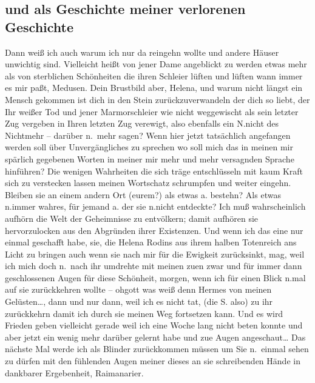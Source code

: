 \documentclass[
]{article}
\author{}
\date{\vspace{-2.5em}}
\begin{document}
\subsection{und als Geschichte meiner verlorenen
Geschichte}\label{und-als-geschichte-meiner-verlorenen-geschichte}

Dann weiß ich auch warum ich nur da reingehn wollte und andere Häuser
unwichtig sind. Vielleicht heißt von jener Dame angeblickt zu werden
etwas mehr als von sterblichen Schönheiten die ihren Schleier lüften und
lüften wann immer es mir paßt, Medusen. Dein Brustbild aber, Helena, und
warum nicht längst ein Mensch gekommen ist dich in den Stein
zurückzuverwandeln der dich so liebt, der Ihr weißer Tod und jener
Marmorschleier wie nicht weggewischt als sein letzter Zug vergeben in
Ihren letzten Zug verewigt, also ebenfalls ein N.nicht des Nichtmehr --
darüber n.~mehr sagen? Wenn hier jetzt tatsächlich angefangen werden
soll über Unvergängliches zu sprechen wo soll mich das in meinen mir
spärlich gegebenen Worten in meiner mir mehr und mehr versagnden Sprache
hinführen? Die wenigen Wahrheiten die sich träge entschlüsseln mit kaum
Kraft sich zu verstecken lassen meinen Wortschatz schrumpfen und weiter
eingehn. Bleiben sie an einem andern Ort (eurem?) als etwas a. bestehn?
Als etwas n.immer wahres, für jemand a. der sie n.nicht entdeckte? Ich
muß wahrscheinlich aufhörn die Welt der Geheimnisse zu entvölkern; damit
aufhören sie hervorzulocken aus den Abgründen ihrer Existenzen. Und wenn
ich das eine nur einmal geschafft habe, sie, die Helena Rodins aus ihrem
halben Totenreich ans Licht zu bringen auch wenn sie nach mir für die
Ewigkeit zurücksinkt, mag, weil ich mich doch n.~nach ihr umdrehte mit
meinen zuen zwar und für immer dann geschlossenen Augen für diese
Schönheit, morgen, wenn ich für einen Blick n.mal auf sie zurückkehren
wollte -- ohgott was weiß denn Hermes von meinen Gelüsten\ldots, dann
und nur dann, weil ich es nicht tat, (die S. also) zu ihr zurückkehrn
damit ich durch sie meinen Weg fortsetzen kann. Und es wird Frieden
geben vielleicht gerade weil ich eine Woche lang nicht beten konnte und
aber jetzt ein wenig mehr darüber gelernt habe und zue Augen
angeschaut\ldots{} Das nächste Mal werde ich als Blinder zurückkommen
müssen um Sie n.~einmal sehen zu dürfen mit den fühlenden Augen meiner
dieses an sie schreibenden Hände in dankbarer Ergebenheit, Raimanarier.
\end{document}
